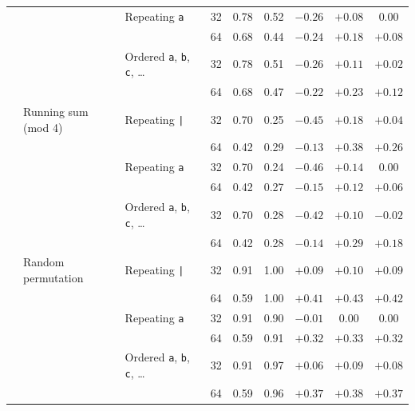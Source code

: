 \begin{tabular}{ll l c cc cc c}
 &  & Repeating \texttt{a} & 32 & 0.78 & 0.52 & $-0.26$ & $+0.08$ & 0.00 \\
 &  &  & 64 & 0.68 & 0.44 & $-0.24$ & $+0.18$ & $+0.08$ \\
 &  & Ordered \texttt{a}, \texttt{b}, \texttt{c}, \ldots & 32 & 0.78 & 0.51 & $-0.26$ & $+0.11$ & $+0.02$ \\
 &  &  & 64 & 0.68 & 0.47 & $-0.22$ & $+0.23$ & $+0.12$ \\
\addlinespace
 & Running sum (mod 4) & Repeating \texttt{|} & 32 & 0.70 & 0.25 & $-0.45$ & $+0.18$ & $+0.04$ \\
 &  &  & 64 & 0.42 & 0.29 & $-0.13$ & $+0.38$ & $+0.26$ \\
 &  & Repeating \texttt{a} & 32 & 0.70 & 0.24 & $-0.46$ & $+0.14$ & 0.00 \\
 &  &  & 64 & 0.42 & 0.27 & $-0.15$ & $+0.12$ & $+0.06$ \\
 &  & Ordered \texttt{a}, \texttt{b}, \texttt{c}, \ldots & 32 & 0.70 & 0.28 & $-0.42$ & $+0.10$ & $-0.02$ \\
 &  &  & 64 & 0.42 & 0.28 & $-0.14$ & $+0.29$ & $+0.18$ \\
\addlinespace
 & Random permutation & Repeating \texttt{|} & 32 & 0.91 & 1.00 & $+0.09$ & $+0.10$ & $+0.09$ \\
 &  &  & 64 & 0.59 & 1.00 & $+0.41$ & $+0.43$ & $+0.42$ \\
 &  & Repeating \texttt{a} & 32 & 0.91 & 0.90 & $-0.01$ & 0.00 & 0.00 \\
 &  &  & 64 & 0.59 & 0.91 & $+0.32$ & $+0.33$ & $+0.32$ \\
 &  & Ordered \texttt{a}, \texttt{b}, \texttt{c}, \ldots & 32 & 0.91 & 0.97 & $+0.06$ & $+0.09$ & $+0.08$ \\
 &  &  & 64 & 0.59 & 0.96 & $+0.37$ & $+0.38$ & $+0.37$ \\
\bottomrule
\end{tabular}
